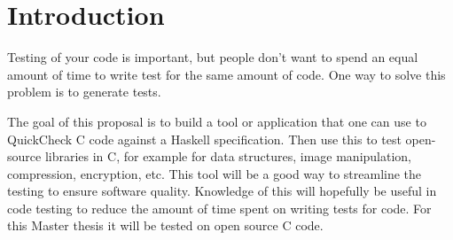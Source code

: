 \section{Introduction}

Testing of your code is important, but people don't want to spend an equal amount of time to write test for the same amount of code.
One way to solve this problem is to generate tests.

The goal of this proposal is to build a tool or application that one can use to QuickCheck C code against a Haskell specification.
Then use this to test open-source libraries in C, for example for data structures, image manipulation, compression, encryption, etc.
This tool will be a good way to streamline the testing to ensure software quality.
Knowledge of this will hopefully be useful in code testing to reduce the amount of time spent on writing tests for code.
For this Master thesis it will be tested on open source C code.

